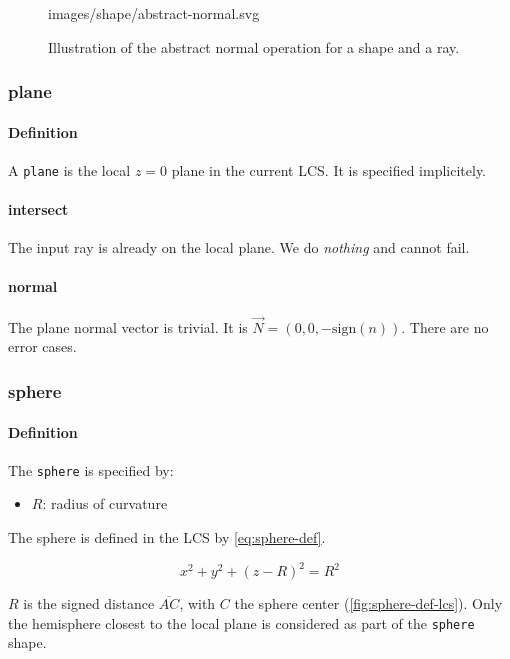 \begin{figure} \caption{\label{fig:abstract-normal} Illustration of the
abstract normal operation for a shape and a ray.}

           {images/shape/abstract-normal.svg}
\end{figure}

\subsubsection{plane}
\paragraph{Definition}
A \lstinline{plane} is the local $z=0$ plane in the current \gls{LCS}.
It is specified implicitely.

\paragraph{intersect}
The input ray is already on the local plane. We do \emph{nothing} and cannot
fail.

\paragraph{normal}
The plane normal vector is trivial.
It is $\overrightarrow{N} = (0, 0, -\textrm{sign}(n))$.
There are no error cases.

\subsubsection{sphere}

\paragraph{Definition}
The \lstinline{sphere} is specified by:

\begin{itemize}
\item $R$: radius of curvature
\end{itemize}

The sphere is defined in the \gls{LCS} by \cref{eq:sphere-def}.

\begin{equation} \label{eq:sphere-def}
x^2 + y^2 + (z - R)^2 = R^2
\end{equation}

$R$ is the signed distance $\overline{AC}$, with $C$ the sphere center
(\cref{fig:sphere-def-lcs}). Only the hemisphere closest to the local plane
is considered as part of the \lstinline{sphere} shape.

